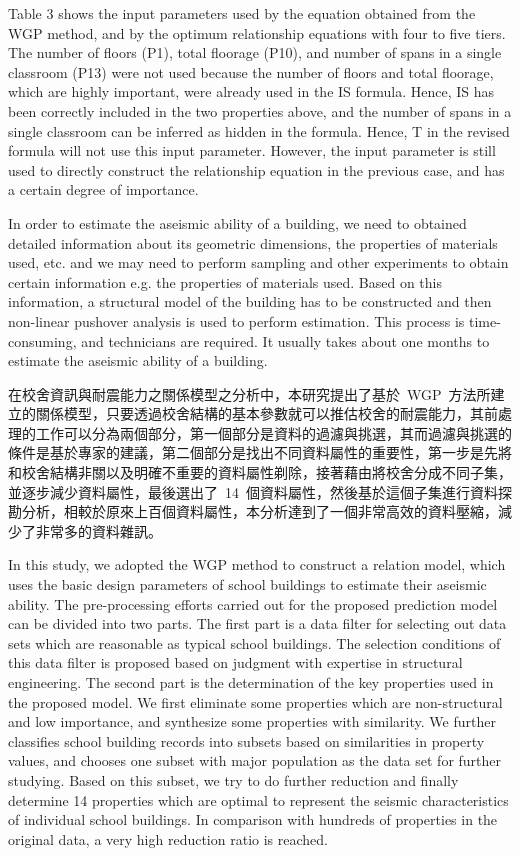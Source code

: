 Table 3 shows the input parameters used by the equation obtained from the WGP method, and by the optimum relationship equations with four to five tiers. The number of floors (P1), total floorage (P10), and number of spans in a single classroom (P13) were not used because the number of floors and total floorage, which are highly important, were already used in the IS formula. Hence, IS has been correctly included in the two properties above, and the number of spans in a single classroom can be inferred as hidden in the formula. Hence, T in the revised formula will not use this input parameter. However, the input parameter is still used to directly construct the relationship equation in the previous case, and has a certain degree of importance.



In order to estimate the aseismic ability of a building, we need to obtained detailed information about its geometric dimensions, the properties of materials used, etc. and we may need to perform sampling and other experiments to obtain certain information e.g. the properties of materials used. Based on this information, a structural model of the building has to be constructed and then non-linear pushover analysis is used to perform estimation. This process is time-consuming, and technicians are required. It usually takes about one months to estimate the aseismic ability of a building.

在校舍資訊與耐震能力之關係模型之分析中，本研究提出了基於~WGP~方法所建立的關係模型，只要透過校舍結構的基本參數就可以推估校舍的耐震能力，其前處理的工作可以分為兩個部分，第一個部分是資料的過濾與挑選，其而過濾與挑選的條件是基於專家的建議，第二個部分是找出不同資料屬性的重要性，第一步是先將和校舍結構非關以及明確不重要的資料屬性剃除，接著藉由將校舍分成不同子集，並逐步減少資料屬性，最後選出了~14~個資料屬性，然後基於這個子集進行資料探勘分析，相較於原來上百個資料屬性，本分析達到了一個非常高效的資料壓縮，減少了非常多的資料雜訊。

In this study, we adopted the WGP method to construct a relation model, which uses the basic design parameters of school buildings to estimate their aseismic ability. The pre-processing efforts carried out for the proposed prediction model can be divided into two parts. The first part is a data filter for selecting out data sets which are reasonable as typical school buildings. The selection conditions of this data filter is proposed based on judgment with expertise in structural engineering. The second part is the determination of the key properties used in the proposed model. We first eliminate some properties which are non-structural and low importance, and synthesize some properties with similarity. We further classifies school building records into subsets based on similarities in property values, and chooses one subset with major population as the data set for further studying. Based on this subset, we try to do further reduction and finally determine 14 properties which are optimal to represent the seismic characteristics of individual school buildings. In comparison with hundreds of properties in the original data, a very high reduction ratio is reached.

